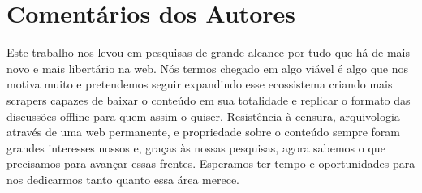\section{Comentários dos Autores}

Este trabalho nos levou em pesquisas de grande alcance por tudo que há de mais novo e mais libertário na web.
Nós termos chegado em algo viável é algo que nos motiva muito e pretendemos seguir expandindo esse ecossistema criando mais scrapers capazes de baixar o conteúdo em sua totalidade e replicar o formato das discussões offline para quem assim o quiser.
Resistência à censura, arquivologia através de uma web permanente, e propriedade sobre o conteúdo sempre foram grandes interesses nossos e, graças às nossas pesquisas, agora sabemos o que precisamos para avançar essas frentes.
Esperamos ter tempo e oportunidades para nos dedicarmos tanto quanto essa área merece.
